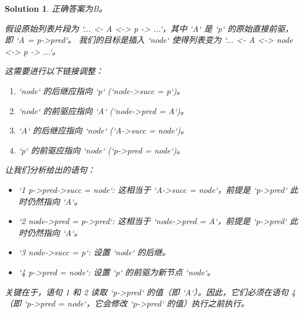 \documentclass[UTF8]{report}
\newtheorem{solution}{Solution}
\theoremstyle{MyLineTheoremStyle} %
\theoremstyle{MyBlockTheoremStyle} %
\theoremstyle{MySubsubsectionStyle} %
\begin{document}
\begin{solution}
正确答案为B。

假设原始列表片段为 `... <- A <-> p -> ...`，其中 `A` 是 `p` 的原始直接前驱，即 `A = p->pred`。
我们的目标是插入 `node` 使得列表变为 `... <- A <-> node <-> p -> ...`。

这需要进行以下链接调整：
\begin{enumerate}
    \item `node` 的后继应指向 `p` (`node->succ = p`)。
    \item `node` 的前驱应指向 `A` (`node->pred = A`)。
    \item `A` 的后继应指向 `node` (`A->succ = node`)。
    \item `p` 的前驱应指向 `node` (`p->pred = node`)。
\end{enumerate}

让我们分析给出的语句：
\begin{itemize}
    \item `1 p->pred->succ = node`: 这相当于 `A->succ = node`，前提是 `p->pred` 此时仍然指向 `A`。
    \item `2 node->pred = p->pred`: 这相当于 `node->pred = A`，前提是 `p->pred` 此时仍然指向 `A`。
    \item `3 node->succ = p`: 设置 `node` 的后继。
    \item `4 p->pred = node`: 设置 `p` 的前驱为新节点 `node`。
\end{itemize}

关键在于，语句 1 和 2 读取 `p->pred` 的值（即 `A`）。因此，它们必须在语句 4（即 `p->pred = node`，它会修改 `p->pred` 的值）执行之前执行。


\end{solution}
\end{document}
